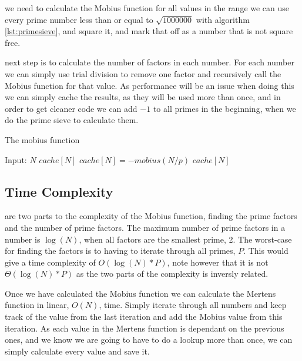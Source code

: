 \documentclass[11pt,a4paper,twoside]{article}
\begin{document}
 we need to calculate the Mobius function for all values in the
range we can use every prime number less than or equal to $\sqrt{1000000}$ with
algorithm \ref{lst:primesieve}, and square it, and mark that off as a number
that is not square free.

 next step is to calculate the number of factors in each number.
For each number we can simply use trial division to remove one factor and
recursively call the Mobius function for that value. As performance will be an
issue when doing this we can simply cache the results, as they will be used
more than once, and in order to get cleaner code we can add $-1$ to all primes
in the beginning, when we do the prime sieve to calculate them.

\begin{algorithm}
    \label{mobius}
    \caption{The mobius function}
    \begin{algorithmic}
        \REQUIRE Input: $N$
            \RETURN $cache[N]$
        \ENDIF
                \STATE $cache[N] = - mobius(N/p)$
                \RETURN $cache[N]$
            \ENDIF
        \ENDFOR
    \end{algorithmic}
\end{algorithm}

\subsection{Time Complexity}
 are two parts to the complexity of the Mobius function,
finding the prime factors and the number of prime factors. The maximum number
of prime factors in a number is $\log(N)$, when all factors are the smallest
prime, 2. The worst-case for finding the factors is to having to iterate
through all primes, $P$. This would give a time complexity of $O(\log(N)*P)$,
note however that it is not $\Theta(\log(N)*P)$ as the two parts of the
complexity is inversly related.

Once we have calculated the Mobius function we can calculate the Mertens
function in linear, $O(N)$, time. Simply iterate through all numbers and keep
track of the value from the last iteration and add the Mobius value from this
iteration. As each value in the Mertens function is dependant on the previous
ones, and we know we are going to have to do a lookup more than once, we can
simply calculate every value and save it.


\end{document}
